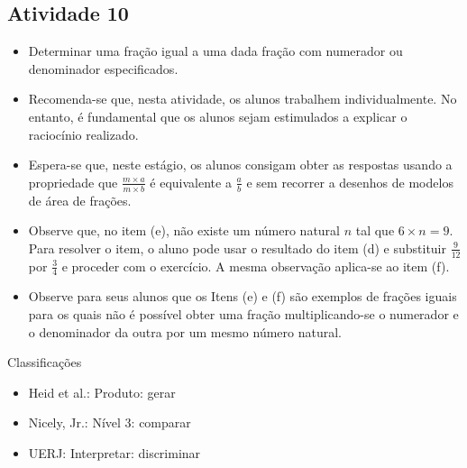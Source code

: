 \documentclass[oneside]{book}
\begin{document}
\begin{multicols}{2}
\subsection{Atividade 10}

\begin{itemize} %
    \item       Determinar uma fração igual a uma dada fração com numerador ou 
denominador especificados.
\end{itemize} %
  
\begin{itemize} %
    \item       Recomenda-se que, nesta atividade, os alunos trabalhem 
individualmente. No entanto, é fundamental que os alunos sejam estimulados a 
explicar o raciocínio realizado.
    \item       Espera-se que, neste estágio, os alunos consigam obter as 
respostas usando a propriedade que       $\frac{m \times a}{m \times b}$       é 
equivalente a       $\frac{a}{b}$       e sem recorrer a desenhos de modelos de 
área de frações.
    \item       Observe que, no item (e), não existe um número natural       $n$ 
      tal que       $6 \times n = 9$. Para resolver o item, o aluno pode usar o 
resultado do item (d) e substituir       $\frac{9}{12}$       por       
$\frac{3}{4}$       e proceder com o exercício. A mesma observação aplica-se ao 
item (f).
    \item       Observe para seus alunos que os Itens (e) e (f) são exemplos de 
frações iguais para os quais não é possível obter uma fração multiplicando-se o 
numerador e o denominador da outra por um mesmo número natural.
\end{itemize} %
  
  
  Classificações  
\begin{itemize} %
    \item       Heid et al.: Produto: gerar
    \item       Nicely, Jr.: Nível 3: comparar
    \item       UERJ: Interpretar: discriminar
\end{itemize} %
  


\end{multicols}
\end{document}
